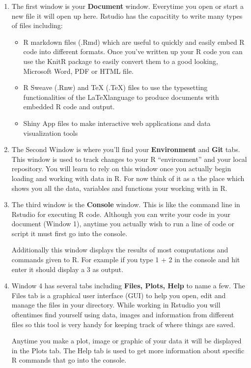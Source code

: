 \documentclass{article}\usepackage[]{graphicx}\usepackage[]{color}
\begin{document}
  \begin{enumerate}
  \item The first window is your \textbf{Document} window. Everytime you open or start a new file it will open up here. Rstudio has the capacitity to write many types of files including: 
  \begin{itemize}
  \item R markdown files (.Rmd) which are useful to quickly and easily embed R code into different formats. Once you've written up your R code you can use the KnitR package to easily convert them to a good looking, Microsoft Word, PDF or HTML file. 
  \item R Sweave (.Rnw) and TeX (.TeX) files to use the typesetting functionalities of the \LaTeX language to produce documents with embedded R code and output. 
  \item Shiny App files to make interactive web applications and data visualization tools
  \end{itemize}
  \item The Second Window is where you'll find your \textbf{Environment} and \textbf{Git} tabs. This window is used to track changes to your R ``environment'' and your local repository. You will learn to rely on this window once you actually begin loading and working with data in R. For now think of it as a the place which shows you all the data, variables and functions your working with in R. 
  \item The third window is the \textbf{Console} window. This is like the command line in Rstudio for executing R code. Although you can write your code in your document (Window 1), anytime you actually wish to run a line of code or script it must first go into the console.
  
  Additionally this window displays the results of most computations and commands given to R. For example if you type 1 + 2 in the console and hit enter it should display a 3 as output.
  
  \item Window 4 has several tabs including \textbf{Files, Plots, Help} to name a few. The Files tab is a graphical user interface (GUI) to help you open, edit and manage the files in your directory. While working in Rstudio you will oftentimes find yourself using data, images and information from different files so this tool is very handy for keeping track of where things are saved.
  
  
  Anytime you make a plot, image or graphic of your data it will be displayed in the Plots tab. The Help tab is used to get more information about specific R commands that go into the console. 
  
  \end{enumerate}
  
\end{document}
